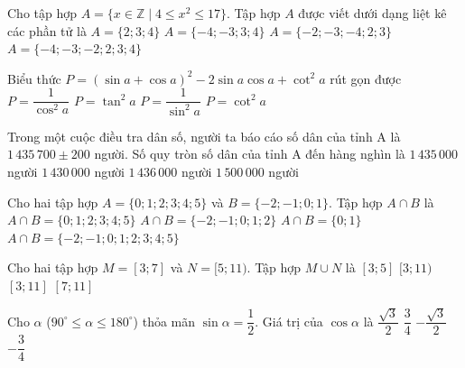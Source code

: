 \begin{ex}%
	Cho tập hợp $A=\{x\in\mathbb{Z}\mid 4\le x^2\le 17\}$. Tập hợp $A$ được viết dưới dạng liệt kê các phần tử là
	\choice
		{$A=\{2;3;4\}$}
		{$A=\{-4;-3;3;4\}$}
		{$A=\{-2;-3;-4;2;3\}$}
		{\True $A=\{-4;-3;-2;2;3;4\}$}
\end{ex}

\begin{ex}%
	Biểu thức $P=(\sin a+\cos a)^2-2\sin a\cos a+\cot^2 a$ rút gọn được
	\choice
		{$P=\dfrac{1}{\cos^2 a}$}
		{$P=\tan^2 a$}
		{\True $P=\dfrac{1}{\sin^2 a}$}
		{$P=\cot^2 a$}
\end{ex}

\begin{ex}%
	Trong một cuộc điều tra dân số, người ta báo cáo số dân của tỉnh A là $1\,435\,700\pm 200$ người. Số quy tròn số dân của tỉnh A đến hàng nghìn là
	\choice
		{$1\,435\,000$ người}
		{$1\,430\,000$ người}
		{\True $1\,436\,000$ người}
		{$1\,500\,000$ người}
\end{ex}

\begin{ex}%
	Cho hai tập hợp $A=\{0;1;2;3;4;5\}$ và $B=\{-2;-1;0;1\}$. Tập hợp $A\cap B$ là
	\choice
		{$A\cap B=\{0;1;2;3;4;5\}$}
		{$A\cap B=\{-2;-1;0;1;2\}$}
		{\True $A\cap B=\{0;1\}$}
		{$A\cap B=\{-2;-1;0;1;2;3;4;5\}$}
\end{ex}

\begin{ex}%
	Cho hai tập hợp $M=[3;7]$ và $N=[5;11)$. Tập hợp $M\cup N$ là
	\choice
		{$[3;5]$}
		{\True $[3;11)$}
		{$[3;11]$}
		{$[7;11]$}
	\loigiai{
		Ta có $M\cup N=[3;7]\cup [5;11)=[3;11)$.
	}
\end{ex}

\begin{ex}%
	Cho $\alpha$ ($90^\circ\le \alpha\le 180^\circ$) thỏa mãn $\sin\alpha=\dfrac{1}{2}$. Giá trị của $\cos\alpha$ là
	\choice
		{$\dfrac{\sqrt{3}}{2}$}
		{$\dfrac{3}{4}$}
		{\True $-\dfrac{\sqrt{3}}{2}$}
		{$-\dfrac{3}{4}$}
\end{ex}

